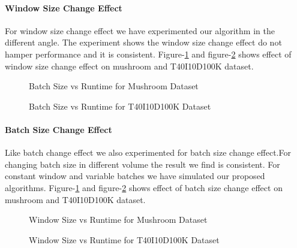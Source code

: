     \paragraph{Window Size Change Effect}For window size change effect we have experimented our algorithm in the different angle. The experiment shows the window size change effect do not hamper performance and it is consistent. Figure-\ref{result:g_m_const_batch} and figure-\ref{result:g_t10_const_batch} shows effect of window size change effect on mushroom and T40I10D100K dataset.
        \begin{figure}[h]
        \centering
            
        \caption{Batch Size vs Runtime for Mushroom Dataset }
        \label{result:g_m_const_batch}
        \end{figure}
        \begin{figure}[h]
        \centering
            
        \caption{Batch Size vs Runtime for T40I10D100K Dataset }
        \label{result:g_t10_const_batch}
        \end{figure}
    \paragraph{Batch Size Change Effect}Like batch change effect we also experimented for batch size change effect.For changing batch size in different volume the result we find is consistent. For constant window and variable batches we have simulated our proposed algorithms. Figure-\ref{result:g_m_const_batch} and figure-\ref{result:g_t10_const_batch} shows effect of batch size change effect on mushroom and T40I10D100K dataset.
        \begin{figure}[h]
        \centering
            
        \caption{Window Size vs Runtime for Mushroom Dataset }
        \label{result:g_m_const_win}
        \end{figure}
        \begin{figure}[h]
        \centering
            
        \caption{Window Size vs Runtime for T40I10D100K Dataset }
        \label{result:g_t10_const_win}
        \end{figure}
\clearpage
